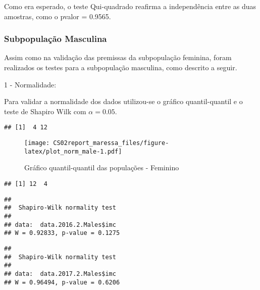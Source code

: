 \documentclass[]{article}
\newenvironment{Shaded}{\begin{snugshade}}{\end{snugshade}}
\newcommand{\DecValTok}[1]{\textcolor[rgb]{0.00,0.00,0.81}{#1}}
\newcommand{\FloatTok}[1]{\textcolor[rgb]{0.00,0.00,0.81}{#1}}
\newcommand{\KeywordTok}[1]{\textcolor[rgb]{0.13,0.29,0.53}{\textbf{#1}}}
\newcommand{\NormalTok}[1]{#1}
\newcommand{\OperatorTok}[1]{\textcolor[rgb]{0.81,0.36,0.00}{\textbf{#1}}}
\begin{document}
Como era esperado, o teste Qui-quadrado reafirma a independência entre
as duas amostras, como o pvalor = 0.9565.

\hypertarget{subpopulacao-masculina}{%
\subsubsection{Subpopulação Masculina}\label{subpopulacao-masculina}}

Assim como na validação das premissas da subpopulação feminina, foram
realizados os testes para a subpopulação masculina, como descrito a
seguir.

1 - Normalidade:

Para validar a normalidade dos dados utilizou-se o gráfico
quantil-quantil e o teste de Shapiro Wilk com \(\alpha = 0.05\).

\begin{verbatim}
## [1]  4 12
\end{verbatim}

\begin{figure}
\centering
\texttt{[image: CS02report\_maressa\_files/figure-latex/plot\_norm\_male-1.pdf]}
\caption{Gráfico quantil-quantil das populações - Feminino}
\end{figure}

\begin{verbatim}
## [1] 12  4
\end{verbatim}

\begin{Shaded}
\end{Shaded}

\begin{verbatim}
## 
##  Shapiro-Wilk normality test
## 
## data:  data.2016.2.Males$imc
## W = 0.92833, p-value = 0.1275
\end{verbatim}

\begin{Shaded}
\end{Shaded}

\begin{verbatim}
## 
##  Shapiro-Wilk normality test
## 
## data:  data.2017.2.Males$imc
## W = 0.96494, p-value = 0.6206
\end{verbatim}
\end{document}
